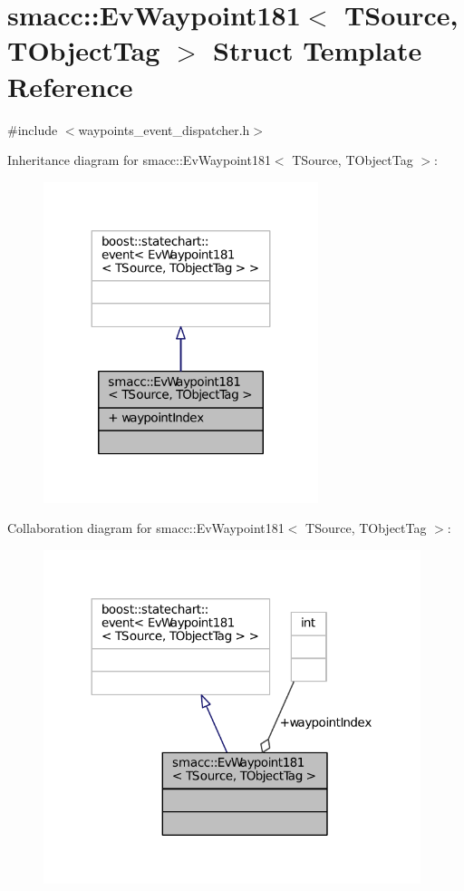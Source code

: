 \hypertarget{structsmacc_1_1EvWaypoint181}{}\section{smacc\+:\+:Ev\+Waypoint181$<$ T\+Source, T\+Object\+Tag $>$ Struct Template Reference}
\label{structsmacc_1_1EvWaypoint181}


{\ttfamily \#include $<$waypoints\+\_\+event\+\_\+dispatcher.\+h$>$}



Inheritance diagram for smacc\+:\+:Ev\+Waypoint181$<$ T\+Source, T\+Object\+Tag $>$\+:
\nopagebreak
\begin{figure}[H]
\begin{center}
\leavevmode
\includegraphics[width=227pt]{structsmacc_1_1EvWaypoint181__inherit__graph}
\end{center}
\end{figure}


Collaboration diagram for smacc\+:\+:Ev\+Waypoint181$<$ T\+Source, T\+Object\+Tag $>$\+:
\nopagebreak
\begin{figure}[H]
\begin{center}
\leavevmode
\includegraphics[width=312pt]{structsmacc_1_1EvWaypoint181__coll__graph}
\end{center}
\end{figure}
